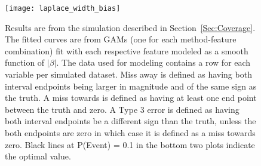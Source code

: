 
\begin{figure}[hbtp]
  \begin{center}
  \texttt{[image: laplace\_width\_bias]}
  \caption{\label{Fig:laplace_width_bias} Results are from the simulation described in Section~\ref{Sec:Coverage}. The fitted curves are from GAMs (one for each method-feature combination) fit with each respective feature modeled as a smooth function of $|\beta|$. The data used for modeling contains a row for each variable per simulated dataset. Miss away is defined as having both interval endpoints being larger in magnitude and of the same sign as the truth. A miss towards is defined as having at least one end point between the truth and zero. A Type 3 error is defined as having both interval endpoints be a different sign than the truth, unless the both endpoints are zero in which case it is defined as a miss towards zero. Black lines at P(Event) = 0.1 in the bottom two plots indicate the optimal value.}
  \end{center}
\end{figure}

